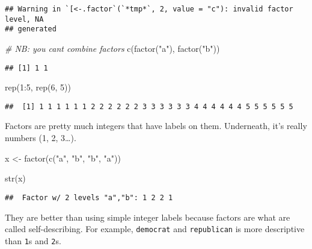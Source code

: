 \documentclass[
]{book}
\newenvironment{Shaded}{\begin{snugshade}}{\end{snugshade}}
\newcommand{\CommentTok}[1]{\textcolor[rgb]{0.56,0.35,0.01}{\textit{#1}}}
\newcommand{\DecValTok}[1]{\textcolor[rgb]{0.00,0.00,0.81}{#1}}
\newcommand{\FunctionTok}[1]{\textcolor[rgb]{0.00,0.00,0.00}{#1}}
\newcommand{\NormalTok}[1]{#1}
\newcommand{\OtherTok}[1]{\textcolor[rgb]{0.56,0.35,0.01}{#1}}
\newcommand{\SpecialCharTok}[1]{\textcolor[rgb]{0.00,0.00,0.00}{#1}}
\newcommand{\StringTok}[1]{\textcolor[rgb]{0.31,0.60,0.02}{#1}}
\begin{document}
\begin{verbatim}
## Warning in `[<-.factor`(`*tmp*`, 2, value = "c"): invalid factor level, NA
## generated
\end{verbatim}

\begin{Shaded}
\begin{Highlighting}[]
\CommentTok{\# NB: you can\textquotesingle{}t combine factors}
\FunctionTok{c}\NormalTok{(}\FunctionTok{factor}\NormalTok{(}\StringTok{"a"}\NormalTok{), }\FunctionTok{factor}\NormalTok{(}\StringTok{"b"}\NormalTok{))}
\end{Highlighting}
\end{Shaded}

\begin{verbatim}
## [1] 1 1
\end{verbatim}

\begin{Shaded}
\begin{Highlighting}[]
\FunctionTok{rep}\NormalTok{(}\DecValTok{1}\SpecialCharTok{:}\DecValTok{5}\NormalTok{, }\FunctionTok{rep}\NormalTok{(}\DecValTok{6}\NormalTok{, }\DecValTok{5}\NormalTok{))}
\end{Highlighting}
\end{Shaded}

\begin{verbatim}
##  [1] 1 1 1 1 1 1 2 2 2 2 2 2 3 3 3 3 3 3 4 4 4 4 4 4 5 5 5 5 5 5
\end{verbatim}

Factors are pretty much integers that have labels on them. Underneath, it's really numbers (1, 2, 3\ldots).

\begin{Shaded}
\begin{Highlighting}[]
\NormalTok{x }\OtherTok{\textless{}{-}} \FunctionTok{factor}\NormalTok{(}\FunctionTok{c}\NormalTok{(}\StringTok{"a"}\NormalTok{, }\StringTok{"b"}\NormalTok{, }\StringTok{"b"}\NormalTok{, }\StringTok{"a"}\NormalTok{))}

\FunctionTok{str}\NormalTok{(x)}
\end{Highlighting}
\end{Shaded}

\begin{verbatim}
##  Factor w/ 2 levels "a","b": 1 2 2 1
\end{verbatim}

They are better than using simple integer labels because factors are what are called self-describing. For example, \texttt{democrat} and \texttt{republican} is more descriptive than \texttt{1}s and \texttt{2}s.
\end{document}
